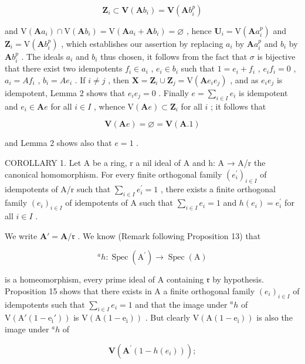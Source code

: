 \[
\mathbf {Z} _ {i} \subset \mathbf {V} (\mathbf {A} b _ {i}) = \mathbf {V} (\mathbf {A} b _ {i} ^ {p})
\]

and \(\mathrm{V}(\mathbf{A}a_i)\cap \mathrm{V}(\mathbf{A}b_i) = \mathrm{V}(\mathbf{A}a_i + \mathbf{A}b_i) = \varnothing\) , hence \(\mathbf{U}_i = \mathrm{V}(\mathbf{A}a_i^p)\) and \(\mathbf{Z}_i = \mathrm{V}(\mathbf{A}b_i^p)\) , which establishes our assertion by replacing \(a_i\) by \(\mathbf{A}a_i^p\) and \(b_i\) by \(\mathbf{A}b_i^p\) . The ideals \(a_i\) and \(b_i\) thus chosen, it follows from the fact that \(\sigma\) is bijective that there exist two idempotents \(f_i\in a_i\) , \(e_i\in b_i\) such that \(1 = e_i + f_i\) , \(e_i f_i = 0\) , \(a_i = Af_i\) , \(b_i = Ae_i\) . If \(i\neq j\) , then \(\mathbf{X} = \mathbf{Z}_i\cup \mathbf{Z}_j = \mathrm{V}(\mathbf{A}e_i e_j)\) , and as \(e_i e_j\) is idempotent, Lemma 2 shows that \(e_i e_j = 0\) . Finally \(e = \sum_{i\in I}e_i\) is idempotent and \(e_i\in \mathbf{A}e\) for all \(i\in I\) , whence \(\mathrm{V}(\mathbf{A}e)\subset \mathbf{Z}_i\) for all \(i\) ; it follows that

\[
\mathbf {V} (\mathbf {A} e) = \varnothing = \mathbf {V} (\mathbf {A}. 1)
\]

and Lemma 2 shows also that \(e = 1\) .

COROLLARY 1. Let A be a ring, r a nil ideal of A and h: A → A/r the canonical homomorphism. For every finite orthogonal family \((e_{i}^{\prime})_{i\in I}\) of idempotents of A/r such that \(\sum_{i\in I} e_{i}^{\prime}=1\) , there exists a finite orthogonal family \((e_{i})_{i\in I}\) of idempotents of A such that \(\sum_{i\in I} e_{i}=1\) and \(h(e_{i})=e_{i}^{\prime}\) for all \(i\in I\) .

We write \(\mathbf{A}' = \mathbf{A} / \mathfrak{r}\) . We know (Remark following Proposition 13) that

\[
^ {a} h \colon \operatorname{Spec} (\mathrm{A} ^ {\prime}) \rightarrow \operatorname{Spec} (\mathrm{A})
\]

is a homeomorphism, every prime ideal of A containing \(\mathfrak{r}\) by hypothesis. Proposition 15 shows that there exists in A a finite orthogonal family \((e_i)_{i\in I}\) of idempotents such that \(\sum_{i\in I}e_i = 1\) and that the image under \(^ah\) of \(\mathrm{V(A'(1 - e_i'))}\) is \(\mathrm{V(A(1 - e_i))}\) . But clearly \(\mathrm{V(A(1 - e_i))}\) is also the image under \(^ah\) of

\[
\mathbf {V} (\mathbf {A} ^ {\prime} (1 - h (e _ {i})))  ;
\]


